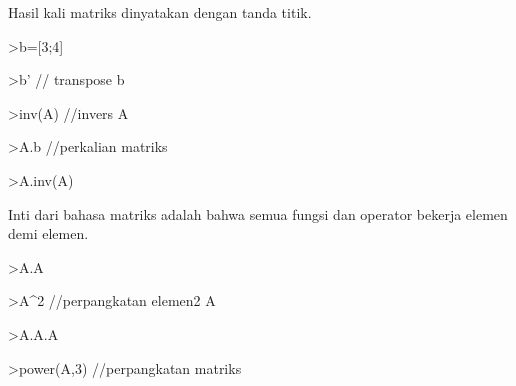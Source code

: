 \documentclass[a4paper,10pt]{article}
\begin{document}
\begin{eulernotebook}
\begin{euleroutput}
  Hasil kali matriks dinyatakan dengan tanda titik.
  
\end{euleroutput}
\begin{eulerprompt}
>b=[3;4]
\end{eulerprompt}
\begin{euleroutput}
  
\end{euleroutput}
\begin{eulerprompt}
>b' // transpose b
\end{eulerprompt}
\begin{euleroutput}
  
\end{euleroutput}
\begin{eulerprompt}
>inv(A) //invers A
\end{eulerprompt}
\begin{euleroutput}
  
\end{euleroutput}
\begin{eulerprompt}
>A.b //perkalian matriks
\end{eulerprompt}
\begin{euleroutput}
  
\end{euleroutput}
\begin{eulerprompt}
>A.inv(A)
\end{eulerprompt}
\begin{euleroutput}
  
  Inti dari bahasa matriks adalah bahwa semua fungsi dan operator bekerja elemen demi elemen.
  
\end{euleroutput}
\begin{eulerprompt}
>A.A
\end{eulerprompt}
\begin{euleroutput}
  
\end{euleroutput}
\begin{eulerprompt}
>A^2 //perpangkatan elemen2 A
\end{eulerprompt}
\begin{euleroutput}
  
\end{euleroutput}
\begin{eulerprompt}
>A.A.A
\end{eulerprompt}
\begin{euleroutput}
  
\end{euleroutput}
\begin{eulerprompt}
>power(A,3) //perpangkatan matriks
\end{eulerprompt}
\begin{euleroutput}
  

\end{euleroutput}
\end{eulernotebook}
\end{document}
